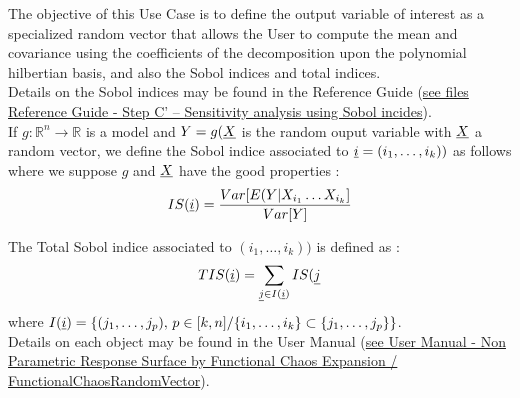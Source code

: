 \renewcommand{\filename}{docUC_OVI_SpecializedPolyChaosExp.tex}
\renewcommand{\filetitle}{UC : Creation of a specialized random vector for the global sensitivity analysis using a polynomial chaos expansion}

\HeaderIIILevel

\label{FunctionalChaosRandomVector}


The objective of this Use Case is to define the output variable of interest as a specialized random vector that allows the User to compute the mean and covariance using the coefficients of the  decomposition upon the polynomial hilbertian basis, and also the Sobol indices and total indices.\\


Details on the Sobol indices may be found in the Reference Guide (\href{OpenTURNS_ReferenceGuide.pdf}{see files Reference Guide - Step C' -- Sensitivity analysis using Sobol incides}).\\

If $g : \mathbb{R}^n \longrightarrow \mathbb{R}$ is a model and $Y = g({\underline{X}}$ is the random ouput variable with ${\underline{X}}$ a random vector, we define the Sobol indice associated to ${\underline{i}} = (i_1, \dots, i_k) )$ as follows where we suppose $g$ and ${\underline{X}}$ have the good properties :
$$
IS({\underline{i}}) = \displaystyle \frac{Var[E(Y|X_{i_1} \dots X_{i_k}]}{Var[Y]}
$$

The Total Sobol indice associated to $(i_1, \dots, i_k) )$ is defined as :
$$
\displaystyle TIS({\underline{i}}) = \sum_{{\underline{j}} \in I({\underline{i}})} IS({\underline{j}}
$$
where $I({\underline{i}}) = \left\{ (j_1, \dots, j_p), \, p \in [k,n]/ \{i_1, \dots, i_k\} \subset  \{j_1, \dots, j_p\}  \right\}$.\\



Details on each object may be found in the User Manual  (\href{OpenTURNS_UserManual_TUI.pdf}{see User Manual - Non Parametric Response Surface by Functional Chaos Expansion / FunctionalChaosRandomVector}).\\

